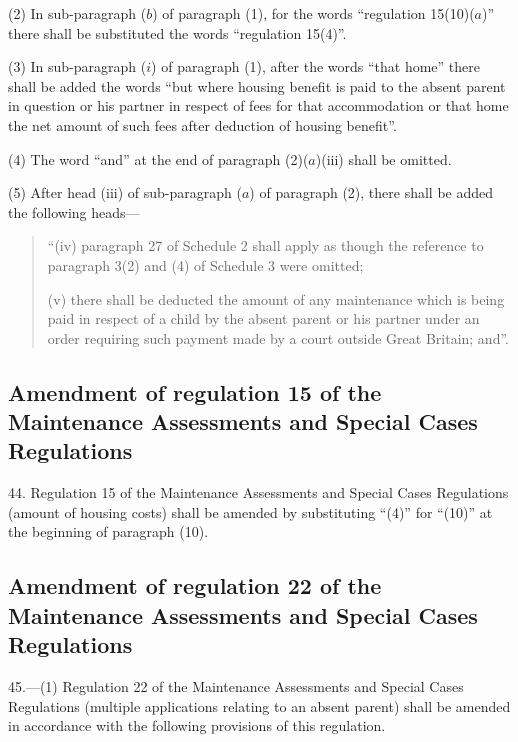 \documentclass[a4paper]{article}
\begin{document}
\begin{sloppypar}
(2) In sub-paragraph ($b$) of paragraph (1), for the words “regulation 15(10)($a$)” there shall be substituted the words “regulation 15(4)”.
\end{sloppypar}

(3) In sub-paragraph ($i$) of paragraph (1), after the words “that home” there shall be added the words “but where housing benefit is paid to the absent parent in question or his partner in respect of fees for that accommodation or that home the net amount of such fees after deduction of housing benefit”.

(4) The word “and” at the end of paragraph (2)($a$)(iii) shall be omitted.

(5) After head (iii) of sub-paragraph ($a$) of paragraph (2), there shall be added the following heads—
\begin{quotation}
“(iv) paragraph 27 of Schedule 2 shall apply as though the reference to paragraph 3(2) and (4) of Schedule 3 were omitted;

(v) there shall be deducted the amount of any maintenance which is being paid in respect of a child by the absent parent or his partner under an order requiring such payment made by a court outside Great Britain; and”.
\end{quotation}

\subsection[44. Amendment of regulation 15 of the Maintenance Assessments and Special Cases Regulations]{Amendment of regulation 15 of the Maintenance Assessments and Special Cases Regulations}

44.  Regulation 15 of the Maintenance Assessments and Special Cases Regulations (amount of housing costs) shall be amended by substituting “(4)” for “(10)” at the beginning of paragraph (10).

\subsection[45. Amendment of regulation 22 of the Maintenance Assessments and Special Cases Regulations]{Amendment of regulation 22 of the Maintenance Assessments and Special Cases Regulations}

45.—(1) Regulation 22 of the Maintenance Assessments and Special Cases Regulations (multiple applications relating to an absent parent) shall be amended in accordance with the following provisions of this regulation.
\end{document}
